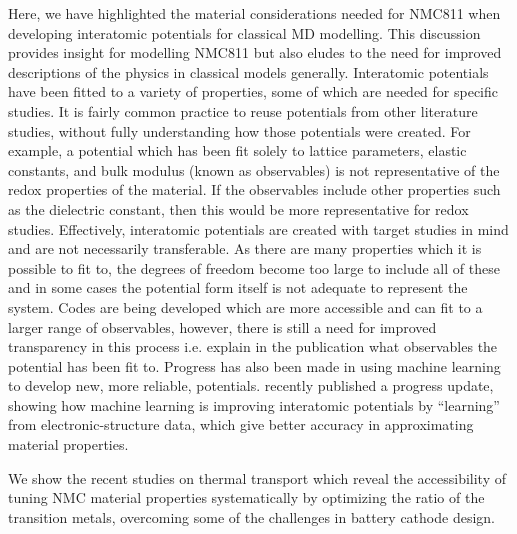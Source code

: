 \documentclass[journal=jacsat,manuscript=article]{achemso}
\begin{document}
Here, we have highlighted the material considerations needed for NMC811 when developing interatomic potentials for classical MD modelling. This discussion provides insight for modelling NMC811 but also eludes to the need for improved descriptions of the physics in classical models generally. Interatomic potentials have been fitted to a variety of properties, some of which are needed for specific studies. It is fairly common practice to reuse potentials from other literature studies, without fully understanding how those potentials were created. For example, a potential which has been fit solely to lattice parameters, elastic constants, and bulk modulus (known as observables) is not representative of the redox properties of the material. If the observables include other properties such as the dielectric constant, then this would be more representative for redox studies. Effectively, interatomic potentials are created with target studies in mind and are not necessarily transferable. As there are many properties which it is possible to fit to, the degrees of freedom become too large to include all of these and in some cases the potential form itself is not adequate to represent the system. Codes are being developed which are more accessible and can fit to a larger range of observables, however, there is still a need for improved transparency in this process i.e. explain in the publication what observables the potential has been fit to. Progress has also been made in using machine learning to develop new, more reliable, potentials. \citeauthor{deringer2019machine} recently published a progress update, showing how machine learning is improving interatomic potentials by ``learning'' from electronic-structure data, which give better accuracy in approximating material properties. \cite{deringer2019machine}


We show the recent studies on thermal transport which reveal the accessibility of tuning NMC material properties systematically by optimizing the ratio of the transition metals, overcoming some of the challenges in battery cathode design.
\end{document}
